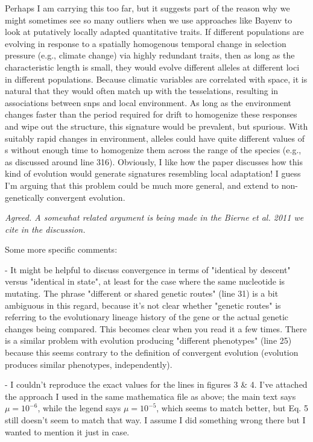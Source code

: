 \documentclass[12pt,letterpaper]{article}
\newcommand{\response}[1]{\emph{ \color{blue} #1}}
\begin{document}
Perhaps I am carrying this too far, but it suggests part of the reason why we might sometimes see so many outliers when we use approaches like Bayenv to look at putatively locally adapted quantitative traits. If different populations are evolving in response to a spatially homogenous temporal change in selection pressure (e.g., climate change) via highly redundant traits, then as long as the characteristic length is small, they would evolve different alleles at different loci in different populations. Because climatic variables are correlated with space, it is natural that they would often match up with the tesselations, resulting in associations between snps and local environment. As long as the environment changes faster than the period required for drift to homogenize these responses and wipe out the structure, this signature would be prevalent, but spurious. With suitably rapid changes in environment, alleles could have quite different values of s without enough time to homogenize them across the range of the species (e.g., as discussed around line 316). Obviously, I like how the paper discusses how this kind of evolution would generate signatures resembling local adaptation! I guess I'm arguing that this problem could be much more general, and extend to non-genetically convergent evolution.

\response{Agreed. A somewhat related argument is being made in the Bierne et al. 2011 we cite in the discussion.}

Some more specific comments:

- It might be helpful to discuss convergence in terms of "identical by descent" versus "identical in state", at least for the case where the same nucleotide is mutating. The phrase "different or shared genetic routes" (line 31) is a bit ambiguous in this regard, because it's not clear whether "genetic routes" is referring to the evolutionary lineage history of the gene or the actual genetic changes being compared. This becomes clear when you read it a few times. There is a similar problem with evolution producing "different phenotypes" (line 25) because this seems contrary to the definition of convergent evolution (evolution produces similar phenotypes, independently).

- I couldn't reproduce the exact values for the lines in figures 3 \& 4. I've attached the approach I used in the same mathematica file as above; the main text says $\mu = 10^{-6}$, while the legend says $\mu=10^{-5}$, which seems to match better, but Eq. 5 still doesn't seem to match that way. I assume I did something wrong there but I wanted to mention it just in case.
\end{document}
